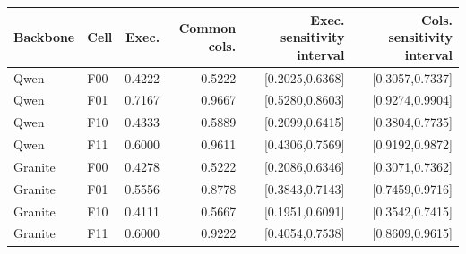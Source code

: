 \begin{tabular}{llrrrr}
\toprule
Backbone & Cell & Exec. & Common cols. & Exec. sensitivity interval & Cols. sensitivity interval \\
\midrule
Qwen & F00 & 0.4222 & 0.5222 & [0.2025,0.6368] & [0.3057,0.7337] \\
Qwen & F01 & 0.7167 & 0.9667 & [0.5280,0.8603] & [0.9274,0.9904] \\
Qwen & F10 & 0.4333 & 0.5889 & [0.2099,0.6415] & [0.3804,0.7735] \\
Qwen & F11 & 0.6000 & 0.9611 & [0.4306,0.7569] & [0.9192,0.9872] \\
Granite & F00 & 0.4278 & 0.5222 & [0.2086,0.6346] & [0.3071,0.7362] \\
Granite & F01 & 0.5556 & 0.8778 & [0.3843,0.7143] & [0.7459,0.9716] \\
Granite & F10 & 0.4111 & 0.5667 & [0.1951,0.6091] & [0.3542,0.7415] \\
Granite & F11 & 0.6000 & 0.9222 & [0.4054,0.7538] & [0.8609,0.9615] \\
\bottomrule
\end{tabular}
